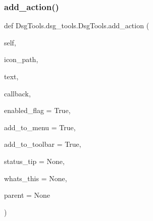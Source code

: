 \subsubsection{\texorpdfstring{add\+\_\+action()}{add\_action()}}
{\footnotesize\ttfamily def Dsg\+Tools.\+dsg\+\_\+tools.\+Dsg\+Tools.\+add\+\_\+action (\begin{DoxyParamCaption}\item[{}]{self,  }\item[{}]{icon\+\_\+path,  }\item[{}]{text,  }\item[{}]{callback,  }\item[{}]{enabled\+\_\+flag = {\ttfamily True},  }\item[{}]{add\+\_\+to\+\_\+menu = {\ttfamily True},  }\item[{}]{add\+\_\+to\+\_\+toolbar = {\ttfamily True},  }\item[{}]{status\+\_\+tip = {\ttfamily None},  }\item[{}]{whats\+\_\+this = {\ttfamily None},  }\item[{}]{parent = {\ttfamily None} }\end{DoxyParamCaption})}

